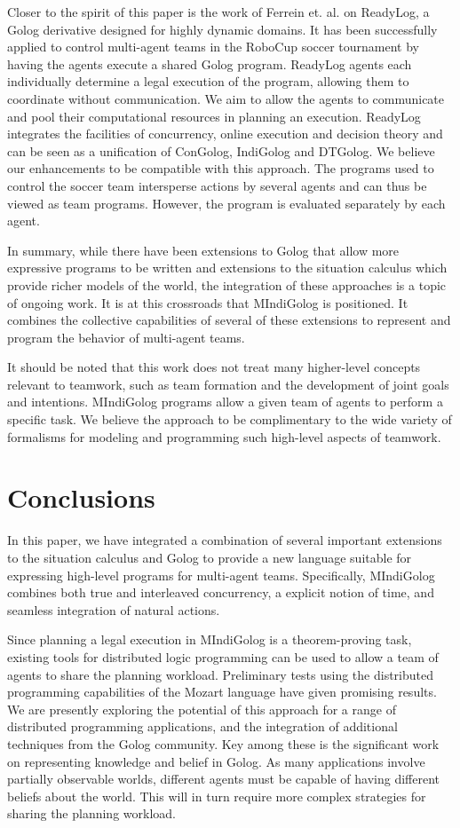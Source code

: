 \documentclass[letterpaper]{article}
\begin{document}
Closer to the spirit of this paper is the work of Ferrein et. al.
\cite{Ferrein2005readylog} on ReadyLog, a Golog derivative designed
for highly dynamic domains. It has been successfully applied to control
multi-agent teams in the RoboCup soccer tournament by having the agents
execute a shared Golog program. ReadyLog agents
each individually determine a legal execution of the program, allowing
them to coordinate without communication.  We aim to allow the agents to
communicate and pool their computational resources in planning an
execution.
ReadyLog integrates
the facilities of concurrency, online execution and decision theory
and can be seen as a unification of ConGolog, IndiGolog and DTGolog.
We believe our enhancements to be compatible with this approach.
The programs used to control the soccer team intersperse actions by
several agents and can thus be viewed as team programs. However, the
program is evaluated separately by each agent.

In summary, while there have been extensions to Golog that allow more
expressive programs to be written and extensions to the situation
calculus which provide richer models of the world, the integration
of these approaches is a topic of ongoing work. It is at this crossroads
that MIndiGolog is positioned. It combines the
collective capabilities of several of these extensions to represent and program
the behavior of multi-agent teams.

It should be noted that this work does not treat many higher-level concepts
relevant
to teamwork, such as team formation and the development of joint goals and
intentions.  MIndiGolog programs allow a given team of agents to
perform a specific task.  We believe the approach to be complimentary to
the wide variety of formalisms for modeling and programming such high-level
aspects of teamwork.

\section{Conclusions}

In this paper, we have integrated a combination of several important
extensions to the situation calculus and Golog to provide a new language
suitable for expressing high-level programs for multi-agent teams.
Specifically, MIndiGolog combines both true and interleaved concurrency,
a explicit notion of time, and seamless integration of natural actions.

Since planning a legal execution in MIndiGolog is a theorem-proving
task, existing tools for distributed logic programming can be used to
allow a team of agents to share the planning workload.  Preliminary
tests using the distributed programming capabilities of the Mozart language
\cite{vanroy99mozart} have given promising results.
We are presently exploring the potential of this approach for a range
of distributed programming applications, and the integration of additional
techniques from the Golog community. Key among
these is the significant work on representing knowledge and belief
in Golog. As many applications involve partially observable worlds,
different agents must be capable of having different beliefs about
the world.  This will in turn require more complex strategies for
sharing the planning workload.
\end{document}
